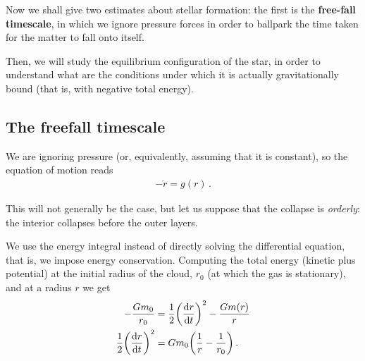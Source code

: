\documentclass[main.tex]{subfiles}
\begin{document}
Now we shall give two estimates about stellar formation: the first is the \textbf{free-fall timescale}, in which we ignore pressure forces in order to ballpark the time taken for the matter to fall onto itself.

Then, we will study the equilibrium configuration of the star, in order to understand what are the conditions under which it is actually gravitationally bound (that is, with negative total energy).




\subsection{The freefall timescale}

We are ignoring pressure (or, equivalently, assuming that it is constant), so the equation of motion reads
%
\begin{align}
  - \ddot{r} = g(r)
\,.
\end{align}

This will not generally be the case, but let us suppose that the collapse is \emph{orderly}: the interior collapses before the outer layers. 

We use the energy integral instead of directly solving the differential equation, that is, we impose energy conservation.
Computing the total energy (kinetic plus potential) at the initial radius of the cloud, \(r_0 \) (at which the gas is stationary), and at a radius \(r\) we get 
%
\begin{align}
  - \frac{G m_0 }{r_0 } &= \frac{1}{2} \qty(\dv{r}{t})^2 - \frac{Gm(r) }{r} \\
  \frac{1}{2} \qty(\dv{r}{t})^2 &= G m_0 \qty( \frac{1}{r} - \frac{1}{r_0 })
\,.
\end{align}
\end{document}
